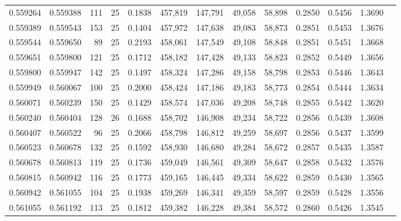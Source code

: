 \begin{tabular}{rrrrrrrrrrrrr}
0.559264 & 0.559388 &   111 &  25 &                                     0.1838 & 457,819 & 147,791 &  49,058 &  58,898 & 0.2850 & 0.5456 & 1.3690 \\
0.559389 & 0.559543 &   153 &  25 &                                     0.1404 & 457,972 & 147,638 &  49,083 &  58,873 & 0.2851 & 0.5453 & 1.3676 \\
0.559544 & 0.559650 &    89 &  25 &                                     0.2193 & 458,061 & 147,549 &  49,108 &  58,848 & 0.2851 & 0.5451 & 1.3668 \\
0.559651 & 0.559800 &   121 &  25 &                                     0.1712 & 458,182 & 147,428 &  49,133 &  58,823 & 0.2852 & 0.5449 & 1.3656 \\
0.559800 & 0.559947 &   142 &  25 &                                     0.1497 & 458,324 & 147,286 &  49,158 &  58,798 & 0.2853 & 0.5446 & 1.3643 \\
0.559949 & 0.560067 &   100 &  25 &                                     0.2000 & 458,424 & 147,186 &  49,183 &  58,773 & 0.2854 & 0.5444 & 1.3634 \\
0.560071 & 0.560239 &   150 &  25 &                                     0.1429 & 458,574 & 147,036 &  49,208 &  58,748 & 0.2855 & 0.5442 & 1.3620 \\
0.560240 & 0.560404 &   128 &  26 &                                     0.1688 & 458,702 & 146,908 &  49,234 &  58,722 & 0.2856 & 0.5439 & 1.3608 \\
0.560407 & 0.560522 &    96 &  25 &                                     0.2066 & 458,798 & 146,812 &  49,259 &  58,697 & 0.2856 & 0.5437 & 1.3599 \\
0.560523 & 0.560678 &   132 &  25 &                                     0.1592 & 458,930 & 146,680 &  49,284 &  58,672 & 0.2857 & 0.5435 & 1.3587 \\
0.560678 & 0.560813 &   119 &  25 &                                     0.1736 & 459,049 & 146,561 &  49,309 &  58,647 & 0.2858 & 0.5432 & 1.3576 \\
0.560815 & 0.560942 &   116 &  25 &                                     0.1773 & 459,165 & 146,445 &  49,334 &  58,622 & 0.2859 & 0.5430 & 1.3565 \\
0.560942 & 0.561055 &   104 &  25 &                                     0.1938 & 459,269 & 146,341 &  49,359 &  58,597 & 0.2859 & 0.5428 & 1.3556 \\
0.561055 & 0.561192 &   113 &  25 &                                     0.1812 & 459,382 & 146,228 &  49,384 &  58,572 & 0.2860 & 0.5426 & 1.3545 \\

\end{tabular}
